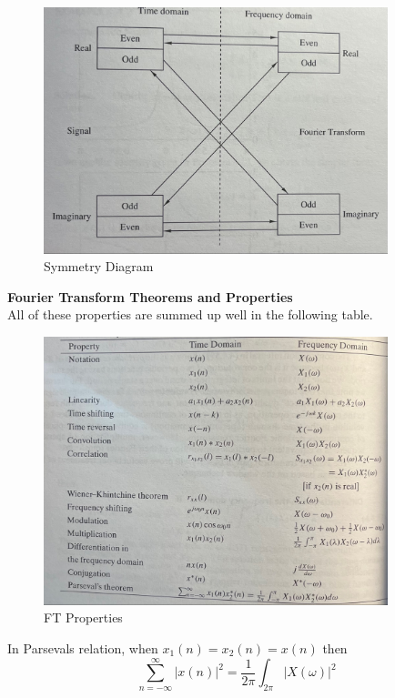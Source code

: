 \documentclass{article} %
\begin{document}
	\begin{figure}[h]
	\centering
	\includegraphics[width=10cm]{symm}
	\caption{Symmetry Diagram}
	\end{figure}
	\textbf{Fourier Transform Theorems and Properties}\\
	All of these properties are summed up well in the following table.
	\begin{figure}[h]
	\centering
	\includegraphics[width=10cm]{prop}
	\caption{FT Properties}
	\end{figure}
	In Parsevals relation, when $x_1(n) = x_2(n) = x(n)$ then
	\begin{equation}
	\sum_{n=-\infty}^{\infty}|x(n)|^2 = \frac{1}{2\pi}\int_{2\pi}|X(\omega)|^2
	\end{equation}
\end{document}
